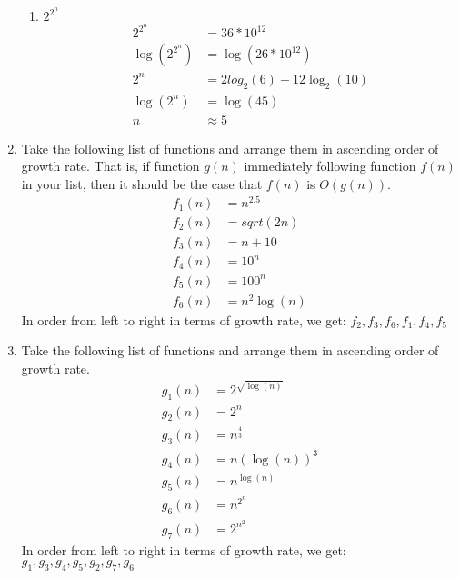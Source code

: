 \documentclass[12pt]{article}
\begin{document}
\begin{enumerate}
\begin{enumerate}
	\item $2^{2^n}$\\
	\begin{align*}
	2^{2^n} &= 36*10^{12}\\
	\log(2^{2^n}) &= \log(26*10^{12})\\
	2^n &= 2log_2(6)+12\log_2(10)\\
	\log(2^n) &= \log(45)\\
	n &\approx 5
	\end{align*}
	
	\end{enumerate}
\item Take the following list of functions and arrange them in ascending order of growth rate. That is, if function $g(n)$ immediately following function $f(n)$ in your list, then it should be the case that $f(n)$ is $O(g(n))$.
	\begin{align*}
	f_1(n) &= n^{2.5}\\
	f_2(n) &= sqrt(2n)\\
	f_3(n) &= n + 10\\
	f_4(n) &= 10^n\\
	f_5(n) &= 100^n\\
	f_6(n) &= n^2\log(n)
	\end{align*}
	In order from left to right in terms of growth rate, we get: $f_2,f_3,f_6,f_1,f_4,f_5$
	
\item Take the following list of functions and arrange them in ascending order of growth rate.
	\begin{align*}
	g_1(n) &= 2^{\sqrt{\log(n)}}\\
	g_2(n) &= 2^n\\
	g_3(n) &= n^{\frac{4}{3}}\\
	g_4(n) &= n(\log(n))^3\\
	g_5(n) &= n^{\log(n)}\\
	g_6(n) &= n^{2^n}\\
	g_7(n) &= 2^{n^2}
	\end{align*}
	In order from left to right in terms of growth rate, we get: $g_1,g_3,g_4,g_5,g_2,g_7,g_6$
\end{enumerate}
\end{document}
